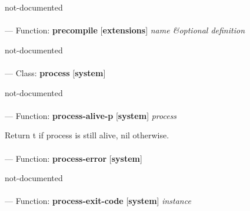 \begin{adjustwidth}{5em}{5em}
not-documented
\end{adjustwidth}

\paragraph{}
\label{EXTENSIONS:PRECOMPILE}
--- Function: \textbf{precompile} [\textbf{extensions}] \textit{name \&optional definition}

\begin{adjustwidth}{5em}{5em}
not-documented
\end{adjustwidth}

\paragraph{}
\label{SYSTEM:PROCESS}
--- Class: \textbf{process} [\textbf{system}] \textit{}

\begin{adjustwidth}{5em}{5em}
not-documented
\end{adjustwidth}

\paragraph{}
\label{SYSTEM:PROCESS-ALIVE-P}
--- Function: \textbf{process-alive-p} [\textbf{system}] \textit{process}

\begin{adjustwidth}{5em}{5em}
Return t if process is still alive, nil otherwise.
\end{adjustwidth}

\paragraph{}
\label{SYSTEM:PROCESS-ERROR}
--- Function: \textbf{process-error} [\textbf{system}] \textit{}

\begin{adjustwidth}{5em}{5em}
not-documented
\end{adjustwidth}

\paragraph{}
\label{SYSTEM:PROCESS-EXIT-CODE}
--- Function: \textbf{process-exit-code} [\textbf{system}] \textit{instance}

